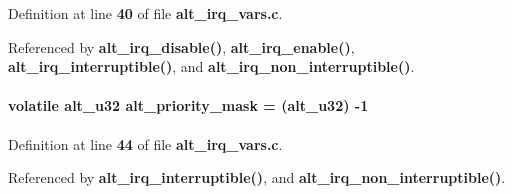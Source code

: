 Definition at line {\bf 40} of file {\bf alt\+\_\+irq\+\_\+vars.\+c}.



Referenced by {\bf alt\+\_\+irq\+\_\+disable()}, {\bf alt\+\_\+irq\+\_\+enable()}, {\bf alt\+\_\+irq\+\_\+interruptible()}, and {\bf alt\+\_\+irq\+\_\+non\+\_\+interruptible()}.

\paragraph[{alt\+\_\+priority\+\_\+mask}]{\setlength{\rightskip}{0pt plus 5cm}volatile {\bf alt\+\_\+u32} alt\+\_\+priority\+\_\+mask = ({\bf alt\+\_\+u32}) -\/1}\label{alt__irq__vars_8c_a0eb33cd42d04f8a99e50d38c6782276a}


Definition at line {\bf 44} of file {\bf alt\+\_\+irq\+\_\+vars.\+c}.



Referenced by {\bf alt\+\_\+irq\+\_\+interruptible()}, and {\bf alt\+\_\+irq\+\_\+non\+\_\+interruptible()}.

